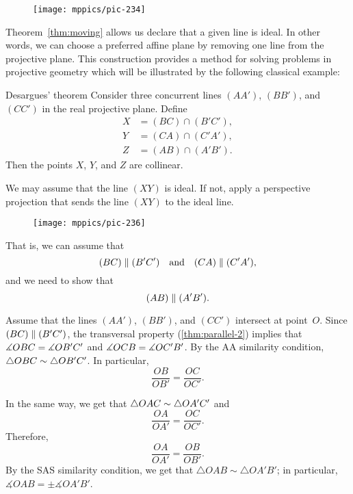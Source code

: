 {

\begin{wrapfigure}{r}{37mm}
\vskip-0mm
\centering
\texttt{[image: mppics/pic-234]}
\end{wrapfigure}

Theorem~\ref{thm:moving} allows us declare that a given line is ideal.
In other words, we can choose a preferred affine plane by removing one line from the projective plane.
This construction provides a method for solving problems in projective geometry 
which will be illustrated by the following classical example:


\begin{thm}{Desargues' theorem}\label{thm:desargues}
Consider three concurrent lines $(AA')$, $(BB')$, and $(CC')$ in the real projective plane.
Define 
\begin{align*}
X&=(BC)\cap (B'C'),\\
Y&=(CA)\cap (C'A'),\\
Z&=(AB)\cap (A'B').
\end{align*}
Then the points $X$, $Y$, and $Z$ are collinear.
\end{thm}

}

We may assume that the line $(XY)$ is ideal.
If not, apply a perspective projection that sends the line $(XY)$ to the ideal line.

\begin{wrapfigure}{o}{40mm}
\vskip-0mm
\centering
\texttt{[image: mppics/pic-236]}
\end{wrapfigure}

That is, we can assume that 
\[(BC)\parallel (B'C')\quad\text{and}\quad(CA)\parallel (C'A'),\]
and we need to show that 
\[(AB)\parallel(A'B').\]

Assume that the lines $(AA')$, $(BB')$, and $(CC')$ intersect at point~$O$.
Since $(BC)\parallel (B'C')$, 
the transversal property (\ref{thm:parallel-2}) implies that $\measuredangle OBC= \measuredangle OB'C'$ and $\measuredangle OCB= \measuredangle OC'B'$.
By the AA similarity condition, $\triangle OBC\sim\triangle OB'C'$.
In particular,
\[\frac{OB}{OB'}=\frac{OC}{OC'}.\]

In the same way, we get that $\triangle OAC\sim\triangle OA'C'$ and
\[\frac{OA}{OA'}=\frac{OC}{OC'}.\]
Therefore, 
\[\frac{OA}{OA'}=\frac{OB}{OB'}.\]
By the SAS similarity condition, 
we get that $\triangle OAB\sim\triangle OA'B'$;
in particular, $\measuredangle OAB=\pm\measuredangle OA'B'$.

